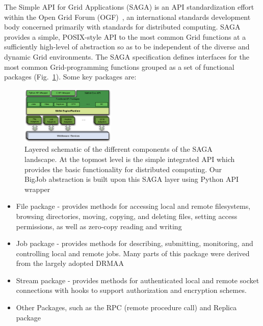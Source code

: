 \documentclass[conference,final]{IEEEtran}
\begin{document}
The Simple API for Grid Applications (SAGA) is an API standardization effort within the Open Grid Forum (OGF)~\cite{ogf_web}, an international standards development body concerned primarily with standards for distributed computing. SAGA provides a simple, POSIX-style API to the most common Grid functions at a sufficiently high-level of abstraction so as to be independent of the diverse and dynamic Grid environments. The SAGA specification defines interfaces for the most common Grid-programming functions grouped as a set of functional packages (Fig.~\ref{Fig:SAGA1}). Some key packages are:

\begin{figure}
 \begin{center}
     \includegraphics[width=0.40\textwidth]{stci_saga_figures-1.eps}
 \end{center}
\caption{\small Layered schematic of the different components of the SAGA landscape. At the topmost level is the simple integrated API which provides the basic functionality for distributed computing. Our BigJob abstraction is built upon this SAGA layer using Python API wrapper}
 \label{Fig:SAGA1}
 \vspace{-1em}
\end{figure}

\begin{itemize}
\item File package - provides methods for accessing local and remote filesystems, browsing directories, moving, copying, and deleting files, setting access permissions, as well as zero-copy reading and writing
\item Job package - provides methods for describing, submitting, monitoring, and controlling local and remote jobs. Many parts of this package were derived from the largely adopted DRMAA %
\item Stream package - provides methods for authenticated local and remote socket connections with hooks to support authorization and encryption schemes.
\item Other Packages, such as the RPC (remote procedure call) and Replica package
\end{itemize}
\end{document}
